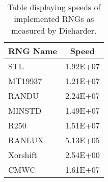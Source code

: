 \begin{table}[tb]
    \caption{Table displaying speeds of implemented RNGs as measured by Dieharder.}
    \label{tab:passesweaksfails}
    \begin{center}
        \begin{tabular}{l|c}
        \hline
        \hline
\textbf{RNG Name} & \textbf{Speed} \\
        \hline
STL               & 1.92E+07       \\
MT19937           & 1.21E+07       \\
RANDU             & 2.24E+07       \\
MINSTD            & 1.49E+07       \\
R250              & 1.51E+07       \\
RANLUX            & 5.13E+05       \\
Xorshift          & 2.54E+00       \\
CMWC              & 1.61E+07       \\
        \hline
        \hline
        \end{tabular}
    \end{center}
\end{table}

